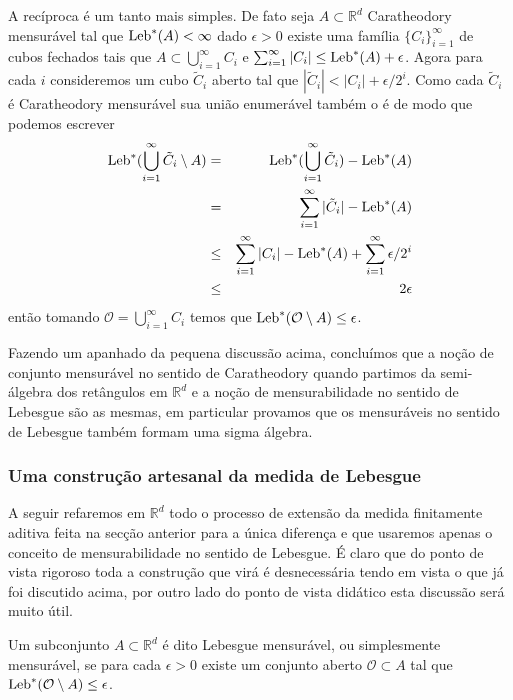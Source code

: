 A recíproca é um tanto mais simples. De fato seja 
$A\subset \mathbb{R}^d$ Caratheodory mensurável 
tal que $\textnormal{Leb}^{*}(A)<\infty$ dado $\epsilon>0$  
existe uma família $\{C_i\}_{i=1}^{\infty}$ de 
cubos fechados tais que 
$A\subset \bigcup_{i=1}^{\infty}C_i$ e 
$\sum_{i=1}^{\infty}|C_i|\leq \textnormal{Leb}^{*}(A)+\epsilon$.
Agora para cada $i$ consideremos um cubo $\tilde{C}_i$ aberto 
tal que $|\tilde{C}_i|<|C_i|+\epsilon/2^{i}.$
Como cada $\tilde{C}_i$ é Caratheodory mensurável sua 
união enumerável também o é de modo que podemos escrever 
\begin{eqnarray*}
\textnormal{Leb}^{*}(\bigcup_{i=1}^{\infty} \tilde{C}_i\setminus A)
&=&
\textnormal{Leb}^{*}(\bigcup_{i=1}^{\infty} \tilde{C}_i)-\textnormal{Leb}^{*}(A)
\\
&
=
&
\sum_{i=1}^{\infty}|\tilde{C}_i|-\textnormal{Leb}^{*}(A)
\\
&
\leq 
&
\sum_{i=1}^{\infty}|C_i|-\textnormal{Leb}^{*}(A)+\sum_{i=1}^{\infty}\epsilon/2^i
\\
&
\leq 
&
2\epsilon
\end{eqnarray*}
então tomando  $\mathcal{O}=\bigcup_{i=1}^{\infty}C_i$ 
temos que $\textnormal{Leb}^{*}(\mathcal{O}\setminus A)\leq \epsilon$.
 
Fazendo um apanhado da pequena discussão acima, 
concluímos que a noção de conjunto mensurável no 
sentido de Caratheodory quando partimos da semi-álgebra 
dos retângulos em $\mathbb{R}^d$ e a noção de mensurabilidade
no sentido de Lebesgue são as mesmas, 
em particular provamos que os mensuráveis no 
sentido de Lebesgue também formam uma sigma álgebra.




\subsubsection{Uma construção artesanal da medida de Lebesgue}

A seguir refaremos em $\mathbb{R}^d$ todo o processo 
de extensão da medida finitamente aditiva feita na 
secção anterior para a única diferença e que 
usaremos apenas o conceito de mensurabilidade 
no sentido de Lebesgue.
É claro que do ponto de vista 
rigoroso toda a construção que virá é 
desnecessária tendo em vista o que já foi discutido acima, 
por outro lado do ponto de vista didático esta 
discussão será  muito útil.









\begin{definicao}
Um subconjunto $A\subset \mathbb{R}^d$ é dito 
Lebesgue mensurável, ou simplesmente mensurável,  
se para cada $\epsilon>0$ existe um 
conjunto aberto $\mathcal{O}\subset A$ 
tal que $\textnormal{Leb}^{*}(\mathcal{O}\setminus A)\leq \epsilon$.
\end{definicao}


